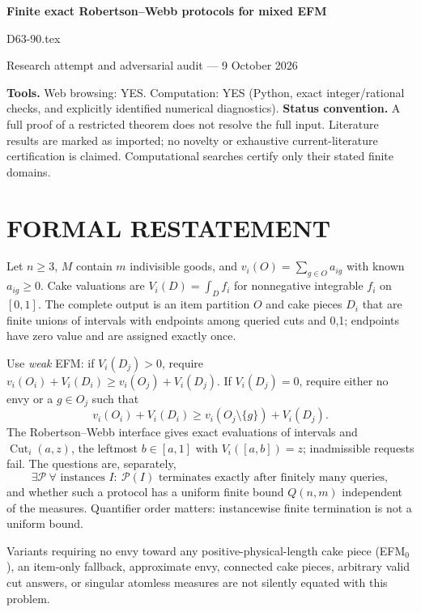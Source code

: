 \documentclass[11pt,a4paper]{article}
\theoremstyle{remark}\newtheorem{remark}[theorem]{Remark}
\begin{document}
\begin{center}
{\LARGE\bfseries Finite exact Robertson--Webb protocols for mixed EFM}\par\medskip
{\large D63-90.tex}\par
Research attempt and adversarial audit --- 9 October 2026
\end{center}
\label{problem:OP-0595}
\label{audited:ECON-009}
\label{audited:conventions}
\textbf{Tools.} Web browsing: YES. Computation: YES (Python, exact integer/rational checks, and explicitly identified numerical diagnostics).
\textbf{Status convention.} A full proof of a restricted theorem does not resolve the full input. Literature results are marked as imported; no novelty or exhaustive current-literature certification is claimed. Computational searches certify only their stated finite domains.

\section{FORMAL RESTATEMENT}
Let $n\ge3$, $M$ contain $m$ indivisible goods, and $v_i(O)=\sum_{g\in O}a_{ig}$ with known $a_{ig}\ge0$. Cake valuations are $V_i(D)=\int_Df_i$ for nonnegative integrable $f_i$ on $[0,1]$. The complete output is an item partition $O$ and cake pieces $D_i$ that are finite unions of intervals with endpoints among queried cuts and 0,1; endpoints have zero value and are assigned exactly once.

Use \emph{weak} EFM: if $V_i(D_j)>0$, require $v_i(O_i)+V_i(D_i)\ge v_i(O_j)+V_i(D_j)$. If $V_i(D_j)=0$, require either no envy or a $g\in O_j$ such that
\[
v_i(O_i)+V_i(D_i)\ge v_i(O_j\setminus\{g\})+V_i(D_j).
\]
The Robertson--Webb interface gives exact evaluations of intervals and $\operatorname{Cut}_i(a,z)$, the leftmost $b\in[a,1]$ with $V_i([a,b])=z$; inadmissible requests fail. The questions are, separately,
\[
\exists\mathcal P\ \forall\text{ instances }I:\ \mathcal P(I)\text{ terminates exactly after finitely many queries},
\]
and whether such a protocol has a uniform finite bound $Q(n,m)$ independent of the measures. Quantifier order matters: instancewise finite termination is not a uniform bound.

Variants requiring no envy toward any positive-physical-length cake piece (EFM$_0$), an item-only fallback, approximate envy, connected cake pieces, arbitrary valid cut answers, or singular atomless measures are not silently equated with this problem.
\end{document}
